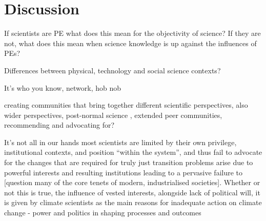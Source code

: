 \chapter{Discussion}\label{ch:discussion}

If scientists are PE what does this mean for the objectivity of science?
If they are not, what does this mean when science knowledge is up against the influences of PEs?

Differences between physical, technology and social science contexts?

It's who you know, network, hob nob

creating communities that bring together different scientific perspectives, also wider perspectives, post-normal science \cite{FuntowiczR1993}, extended peer communities, \cite{Jasanoff2003} recommending and advocating for?

It's not all in our hands
\cite{Bendell2024} most scientists are limited by their own privilege, institutional contexts, and position ``within the system'', and thus fail to advocate for the changes that are required for truly just transition  
\cite{StoddardEtAl2021} problems arise due to powerful interests and resulting institutions leading to a pervasive failure to [question many of the core tenets of modern, industrialised societies]. Whether or not this is true, the influence of vested interests, alongside lack of political will, it is given by climate scientists as the main reasons for inadequate action on climate change \cite{Carrington2024} 
\cite{TurnhoutMWKL2020} - power and politics in shaping processes and outcomes

